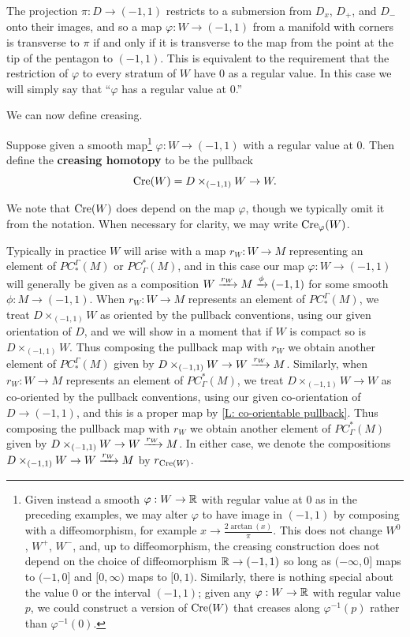 The projection $\pi:D \to (-1,1)$ restricts to a submersion from $D_x$, $D_+$, and $D_-$ onto their images, and so a map $\varphi: W \to (-1,1)$ from a manifold with corners is transverse to $\pi$ if and only if it is transverse to the map from the point at the tip of the pentagon to $(-1,1)$. This is equivalent to the requirement that the restriction of $\varphi$ to every stratum of $W$ have $0$ as a regular value. In this case we will simply say that ``$\varphi$ has a regular value at $0$.''

We can now define creasing.

\begin{definition}
 Suppose given a smooth map\footnote{Given instead a smooth $\varphi:W \to \mathbb{R}$ with regular value at $0$ as in the preceding examples, we may alter $\varphi$ to have image in $(-1,1)$ by composing with a diffeomorphism, for example $x \to \frac{2\arctan(x)}{\pi}$. This does not change $W^0$, $W^+$, $W^-$, and, up to diffeomorphism, the creasing construction does not depend on the choice of diffeomorphism $\mathbb{R} \to (-1,1)$ so long as $(-\infty,0]$ maps to $(-1,0]$ and $[0,\infty)$ maps to $[0,1)$. Similarly, there is nothing special about the value $0$ or the interval $(-1,1)$; given any $\varphi:W \to \mathbb{R}$ with regular value $p$, we could construct a version of $\mathrm{Cre}(W)$ that creases along $\varphi^{-1}(p)$ rather than $\varphi^{-1}(0)$.
} $\varphi:W \to (-1,1)$ with a regular value at $0$. Then define the \textbf{creasing homotopy} to be the pullback
$$\mathrm{Cre}(W) = D\times_{(-1,1)} W \to W.$$

We note that
$\mathrm{Cre}(W)$ does depend on the map $\varphi$, though we typically omit it from the notation. When necessary for clarity, we may write $\mathrm{Cre}_\varphi(W)$.


Typically in practice $W$ will arise with a map $r_W \colon W \to M$ representing an element of $PC_*^\Gamma(M)$ or $PC^*_\Gamma(M)$, and in this case our map $\varphi: W \to (-1,1)$ will generally be given as a composition
 $W\xrightarrow{r_W}M\xrightarrow{\phi} (-1,1)$ for some smooth $\phi:M \to (-1,1)$. When $r_W \colon W \to M$ represents an element of $PC_*^\Gamma(M)$, we treat $D\times_{(-1,1)} W$ as oriented by the pullback conventions, using our given orientation of $D$, and we will show in a moment that if $W$ is compact so is $D\times_{(-1,1)} W$. Thus composing the pullback map with $r_W$ we obtain another element of $PC_*^\Gamma(M)$ given by $D\times_{(-1,1)} W \to W\xrightarrow{r_W}M$. Similarly, when $r_W \colon W \to M$ represents an element of $PC^*_\Gamma(M)$, we treat $D\times_{(-1,1)} W \to W$ as co-oriented by the pullback conventions, using our given co-orientation of $D \to (-1,1)$, and this is a proper map by \cref{L: co-orientable pullback}.
Thus composing the pullback map with $r_W$ we obtain another element of $PC^*_\Gamma(M)$ given by $D\times_{(-1,1)} W \to W\xrightarrow{r_W}M$. In either case, we denote the compositions $D\times_{(-1,1)} W \to W\xrightarrow{r_W}M$ by $r_{\mathrm{Cre}(W)}$.


\end{definition}
